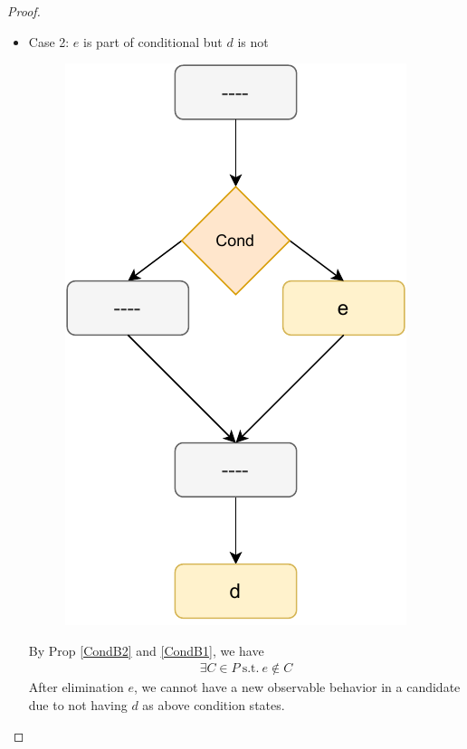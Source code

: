 \begin{proof}
\begin{itemize}
\begin{enumerate}

                    \end{enumerate}


                \item Case 2: $e$ is part of conditional but $d$ is not

                    \begin{figure}[H]
                        \centering 
                        \includegraphics[scale=0.7]{Elimination/ConditionalsProofFig6.pdf}
                        \caption{ }    
                    \end{figure}
                
                
                    By Prop \ref{CondB2} and \ref{CondB1}, we have 
                    \begin{align*}
                        \exists C \in P \ \text{s.t.} \ e \notin C 
                    \end{align*}
                    After elimination $e$, we cannot have a new observable behavior in a candidate due to not having $d$ as above condition states.


\end{itemize}
\end{proof}
